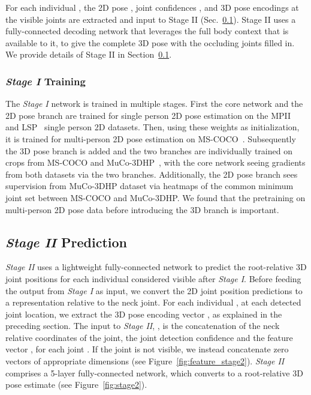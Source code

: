 \documentclass[acmtog,authorversion]{acmart}
\begin{document}
For each individual , the 2D pose , joint confidences , and 3D pose encodings  at the visible joints are extracted and input to Stage II (Sec.~\ref{sec:second_stage}). Stage II uses a fully-connected decoding network that leverages the full body context that is available to it, to give the complete 3D pose with the occluding joints filled in. We provide details of Stage II in Section~\ref{sec:second_stage}. 


\subsubsection{\textit{Stage I} Training}
The \textit{Stage I} network is trained in multiple stages. First the core network and the 2D pose branch are trained for single person 2D pose estimation on the MPII~\cite{andriluka_mpii2d_cvpr14} and LSP~\cite{johnson_lsp_bmvc10,johnson_lspet_cvpr11} single person 2D datasets. Then, using these weights as initialization, it is trained for multi-person 2D pose estimation on MS-COCO~\cite{lin_coco_eccv14}. Subsequently the 3D pose branch is added and the two branches are individually trained on crops from MS-COCO and MuCo-3DHP~\cite{mehta_3dv18}, with the core network seeing gradients from both datasets via the two branches. Additionally, the 2D pose branch sees supervision from MuCo-3DHP dataset via heatmaps of the common minimum joint set between MS-COCO and MuCo-3DHP. We found that the pretraining on multi-person 2D pose data before introducing the 3D branch is important.


\subsection{\textit{Stage II} Prediction}
\label{sec:second_stage}
\textit{Stage II} uses a lightweight fully-connected network to predict the root-relative 3D joint positions  for each individual considered visible after \textit{Stage I}. 
Before feeding the output from \textit{Stage I} as input, we convert the 2D joint position predictions  to a representation relative to the neck joint. For each individual , at each detected joint location, we extract the  3D pose encoding vector , as explained in the preceding section. 
The input to \textit{Stage II}, , is the concatenation of the neck relative  coordinates of the joint, the joint detection confidence  and the feature vector , for each joint . If the joint is not visible, we instead concatenate zero vectors of appropriate dimensions (see Figure~\ref{fig:feature_stage2}).
\textit{Stage II} comprises a 5-layer fully-connected network, which converts  to a root-relative 3D pose estimate  (see Figure~\ref{fig:stage2}). 
\end{document}
